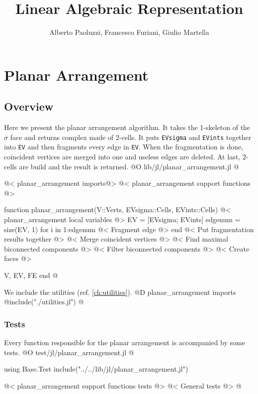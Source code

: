\documentclass[10pt]{book}
\author{Alberto Paoluzzi, Francesco Furiani, Giulio Martella}
\title{Linear Algebraic Representation}
\begin{document}
\frontmatter
\maketitle
\tableofcontents





\mainmatter

\chapter{Planar Arrangement}

\section{Overview}
Here we present the planar arrangement algorithm. It takes the 1-skeleton of the $\sigma$ face and returns complex made of 2-cells.
It puts \texttt{EVsigma} and \texttt{EVints} together into \texttt{EV} and then fragments every edge in \texttt{EV}. 
When the fragmentation is done, coincident vertices are merged into one and useless edges are deleted. At last,
2-cells are build and the result is returned.
@O lib/jl/planar_arrangement.jl
@{@< planar\_arrangement imports@>
@< planar\_arrangement support functions @>

function planar_arrangement(V::Verts, EVsigma::Cells, EVints::Cells)
    @< planar\_arrangement local variables @>
    EV = [EVsigma; EVints]
    edgenum = size(EV, 1)
    for i in 1:edgenum
        @< Fragment edge @>
    end
    @< Put fragmentation results together @>
    @< Merge coincident vertices @>
    @< Find maximal biconnected components @>
    @< Filter biconnected components @>
    @< Create faces @>

    V, EV, FE
end 
@}
We include the utilities (ref. \ref{ch:utilities}).
@D planar\_arrangement imports
@{include("./utilities.jl")
@}
\subsection{Tests}
Every function responsible for the planar arrangement is accompanied by some tests. 
@O test/jl/planar_arrangement.jl
@{using Base.Test
include("../../lib/jl/planar_arrangement.jl")

@< planar\_arrangement support functions tests @>
@< General tests @>
@}
\end{document}
